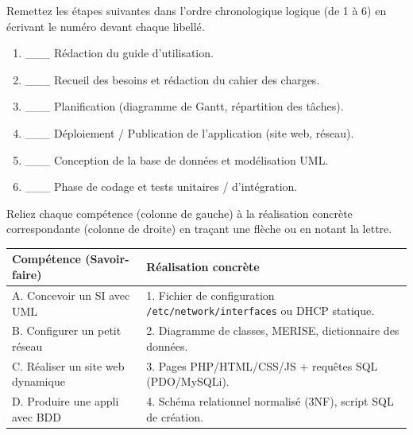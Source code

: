 \documentclass[11pt]{article}
\begin{document}
\begin{exercice}
Remettez les étapes suivantes dans l'ordre chronologique logique (de 1 à 6) en écrivant le numéro devant chaque libellé.
\begin{enumerate}
    \item \_\_\_ Rédaction du guide d'utilisation.
    \item \_\_\_ Recueil des besoins et rédaction du cahier des charges.
    \item \_\_\_ Planification (diagramme de Gantt, répartition des tâches).
    \item \_\_\_ Déploiement / Publication de l'application (site web, réseau).
    \item \_\_\_ Conception de la base de données et modélisation UML.
    \item \_\_\_ Phase de codage et tests unitaires / d'intégration.
\end{enumerate}
\end{exercice}

\begin{exercice}
Reliez chaque compétence (colonne de gauche) à la réalisation concrète correspondante (colonne de droite) en traçant une flèche ou en notant la lettre.

\begin{tabular}{ll}
\textbf{Compétence (Savoir-faire)} & \textbf{Réalisation concrète} \\
\hline
A. Concevoir un SI avec UML & 1. Fichier de configuration \texttt{/etc/network/interfaces} ou DHCP statique. \\
B. Configurer un petit réseau & 2. Diagramme de classes, MERISE, dictionnaire des données. \\
C. Réaliser un site web dynamique & 3. Pages PHP/HTML/CSS/JS + requêtes SQL (PDO/MySQLi). \\
D. Produire une appli avec BDD & 4. Schéma relationnel normalisé (3NF), script SQL de création. \\
\end{tabular}
\end{exercice}
\end{document}

